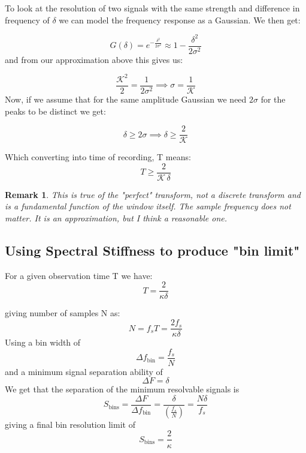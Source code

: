 \documentclass[11pt]{article}
\theoremstyle{breakdef}
\newtheorem{remark}[theorem]{Remark}
\begin{document}
To look at the resolution of two signals with the same strength and difference in frequency of $\delta$ we can model the frequency response as a Gaussian.  We then get:

\begin{equation}
G(\delta) = e^{-\frac{\delta^2}{2\sigma^2}} \approx 1 - \frac{\delta^2}{2\sigma^2}
\end{equation}
and from our approximation above this gives us:

\begin{equation}
\frac{\mathcal{K}^{2}}{2} = \frac{1}{2\sigma^2} \implies \sigma = \frac{1}{\mathcal{K}}
\end{equation}
Now, if we assume that for the same amplitude Gaussian we need $2\sigma$ for the peaks to be distinct we get:

\begin{equation}
\delta \ge 2\sigma \implies \delta \ge \frac{2}{\mathcal{K}}
\end{equation}

Which converting into time  of recording, T means:
\begin{equation}
T \ge \frac{2}{{\mathcal{K} \, \delta} }
\end{equation}

\begin{remark}
This is true of the "perfect" transform, not a discrete transform and is a fundamental function of the window itself.  The sample frequency does not matter.  It is an approximation, but I think a reasonable one.
\end{remark}


\subsection{Using Spectral Stiffness to produce "bin limit"}

For a given observation time T we have:
\begin{equation}
T = \frac{2}{\kappa \delta} 
\end{equation}

giving number of samples N as:
\begin{equation}
N = f_s T = \frac{2 f_s}{\kappa \delta} 
\end{equation}
Using a bin width of 
\begin{equation}
\Delta f_{\text{bin}} = \frac{f_s}{N} 
\end{equation}
and a minimum signal separation ability of
\begin{equation}
\Delta F = \delta
\end{equation}
We get that the separation of the minimum resolvable signals is
\begin{equation}
S_{\text{bins}} = \frac{\Delta F}{\Delta f_{\text{bin}}} = \frac{\delta}{\left(\frac{f_s}{N}\right)} = \frac{N\delta}{f_s} 
\end{equation}
giving a final bin resolution limit of
\begin{equation}
S_{\text{bins}} = \frac{2}{\kappa}
\end{equation}
\end{document}
